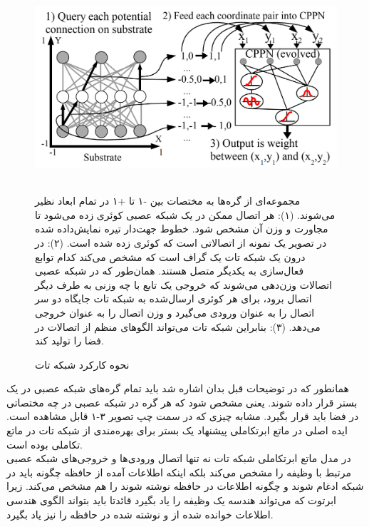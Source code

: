 \begin{figure}[!h]
\begin{center}
\includegraphics[height=7cm]{CPPN.png}
\end{center}
\caption{نحوه کارکرد شبکه تات\cite{merrild2018hyperntm} }
\medskip
\small
مجموعه‌ای از گره‌ها به مختصات بین -۱ تا +۱ در تمام ابعاد نظیر می‌شوند.
(۱): هر اتصال ممکن در یک شبکه عصبی کوئری زده می‌شود تا مجاورت و وزن آن مشخص شود. خطوط جهت‌دار تیره نمایش‌داده شده در تصویر یک نمونه از اتصالاتی است که کوئری زده شده است.
(۲): در درون یک شبکه تات یک گراف است که مشخص می‌کند کدام توابع فعال‌سازی به یکدیگر متصل هستند. همان‌طور که در شبکه عصبی اتصالات وزن‌دهی می‌شوند که خروجی یک تابع با چه وزنی به طرف دیگر اتصال برود، برای هر کوئری ارسال‌شده به شبکه تات جایگاه دو سر اتصال را به عنوان ورودی می‌گیرد و وزن اتصال را به عنوان خروجی می‌دهد. (۳): بنابراین شبکه تات می‌تواند الگوهای منظم از اتصالات در فضا را تولید کند.

\end{figure}

همانطور که در توضیحات قبل بدان اشاره شد باید تمام گره‌های شبکه عصبی در یک بستر قرار داده شوند. یعنی مشخص شود که هر گره در شبکه عصبی در چه مختصاتی در فضا باید قرار بگیرد. مشابه چیزی که در سمت چپ تصویر ۳-۱ قابل مشاهده است. ایده اصلی در ماتع ابرتکاملی پیشنهاد یک بستر برای بهره‌مندی از شبکه تات در ماتع تکاملی بوده است.
\\

در مدل ماتع ابرتکاملی شبکه تات نه تنها اتصال ورودی‌ها و خروجی‌های شبکه عصبی مرتبط با وظیفه را مشخص می‌کند بلکه اینکه اطلاعات آمده از حافظه چگونه باید در شبکه ادغام شوند و چگونه اطلاعات در حافظه نوشته شوند را هم مشخص می‌کند. زیرا ابرتوت که می‌تواند هندسه یک وظیفه را یاد بگیرد قائدتا باید بتواند الگوی هندسی اطلاعات خوانده شده از و نوشته شده در حافظه را نیز یاد بگیرد.\cite{merrild2018hyperntm}
\\

